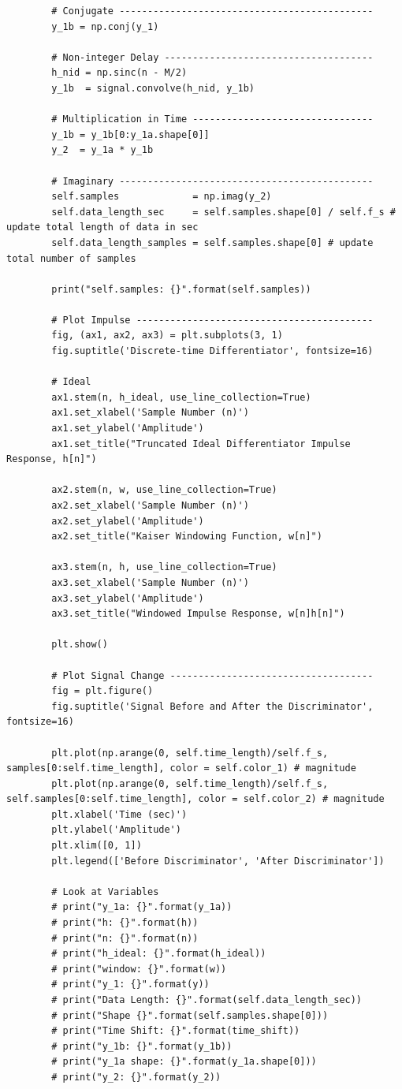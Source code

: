 \documentclass{article}
\begin{document}
\begin{lstlisting}
		# Conjugate ---------------------------------------------
		y_1b = np.conj(y_1) 

		# Non-integer Delay -------------------------------------
		h_nid = np.sinc(n - M/2)
		y_1b  = signal.convolve(h_nid, y_1b)

		# Multiplication in Time --------------------------------
		y_1b = y_1b[0:y_1a.shape[0]]
		y_2  = y_1a * y_1b

		# Imaginary ---------------------------------------------
		self.samples             = np.imag(y_2)
		self.data_length_sec     = self.samples.shape[0] / self.f_s # update total length of data in sec
		self.data_length_samples = self.samples.shape[0] # update total number of samples

		print("self.samples: {}".format(self.samples))

		# Plot Impulse ------------------------------------------
		fig, (ax1, ax2, ax3) = plt.subplots(3, 1)
		fig.suptitle('Discrete-time Differentiator', fontsize=16)

		# Ideal
		ax1.stem(n, h_ideal, use_line_collection=True)
		ax1.set_xlabel('Sample Number (n)')
		ax1.set_ylabel('Amplitude')
		ax1.set_title("Truncated Ideal Differentiator Impulse Response, h[n]")

		ax2.stem(n, w, use_line_collection=True)
		ax2.set_xlabel('Sample Number (n)')
		ax2.set_ylabel('Amplitude')
		ax2.set_title("Kaiser Windowing Function, w[n]")

		ax3.stem(n, h, use_line_collection=True)
		ax3.set_xlabel('Sample Number (n)')
		ax3.set_ylabel('Amplitude')
		ax3.set_title("Windowed Impulse Response, w[n]h[n]")
		
		plt.show()

		# Plot Signal Change ------------------------------------
		fig = plt.figure()
		fig.suptitle('Signal Before and After the Discriminator', fontsize=16)
		
		plt.plot(np.arange(0, self.time_length)/self.f_s, samples[0:self.time_length], color = self.color_1) # magnitude
		plt.plot(np.arange(0, self.time_length)/self.f_s, self.samples[0:self.time_length], color = self.color_2) # magnitude
		plt.xlabel('Time (sec)')
		plt.ylabel('Amplitude')
		plt.xlim([0, 1])
		plt.legend(['Before Discriminator', 'After Discriminator'])

		# Look at Variables
		# print("y_1a: {}".format(y_1a))		
		# print("h: {}".format(h))
		# print("n: {}".format(n))
		# print("h_ideal: {}".format(h_ideal))
		# print("window: {}".format(w))
		# print("y_1: {}".format(y))
		# print("Data Length: {}".format(self.data_length_sec))
		# print("Shape {}".format(self.samples.shape[0]))
		# print("Time Shift: {}".format(time_shift))
		# print("y_1b: {}".format(y_1b))
		# print("y_1a shape: {}".format(y_1a.shape[0]))
		# print("y_2: {}".format(y_2))


\end{lstlisting}
\end{document}
